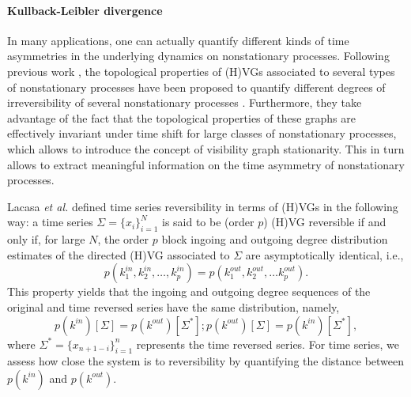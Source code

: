 		\paragraph{Kullback-Leibler divergence}
		In many applications, one can actually quantify different kinds of time asymmetries in the underlying dynamics on nonstationary processes. Following previous work \cite{Lacasa2012}, the topological properties of (H)VGs associated to several types of nonstationary processes have been proposed to quantify different degrees of irreversibility of several nonstationary processes \cite{Lacasa2015}. Furthermore, they take advantage of the fact that the topological properties of these graphs are effectively invariant under time shift for large classes of nonstationary processes, which allows to introduce the concept of visibility graph stationarity. This in turn allows to extract meaningful information on the time asymmetry of nonstationary processes. 

		Lacasa \textit{et al.} \cite{Lacasa2015} defined time series reversibility in terms of (H)VGs in the following way: a time series $\Sigma = \{ x_i \}_{i=1}^N$ is said to be (order $p$) (H)VG reversible if and only if, for large $N$, the order $p$ block ingoing and outgoing degree distribution estimates of the directed (H)VG associated to $\Sigma$ are asymptotically identical, i.e., 
\begin{equation}
p(k_1^{in}, k_2^{in}, \dots, k_p^{in}) = p(k_1^{out}, k_2^{out}, \dots k_p^{out}).
\end{equation}
This property yields that the ingoing and outgoing degree sequences of the original and time reversed series have the same distribution, namely, 
\begin{equation}
p(k^{in}) [\Sigma] = p(k^{out}) [ \Sigma^{\ast}]; p(k^{out}) [\Sigma] = p(k^{in})[\Sigma^{\ast}],  
\end{equation}
where $\Sigma^{\ast} = \{ x_{n+1-i} \}_{i=1}^{n}$ represents the time reversed series. For time series, we assess how close the system is to reversibility by quantifying the distance between $p(k^{in})$ and $p(k^{out})$.  

